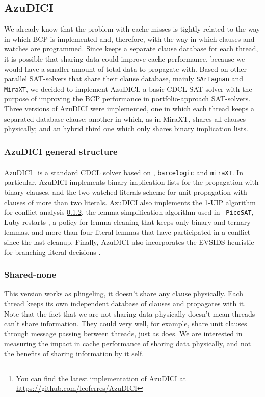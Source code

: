 \subsection{AzuDICI}
\label{sec:azudici}

We already know that the problem with cache-misses is tightly related
to the way in which BCP is implemented \cite{paper cache misses sat} and,
therefore, with the way in which clauses and watches are programmed.
Since \pling keeps a separate clause database for each thread, it is 
possible that sharing data could improve cache performance, because
we would have a smaller amount of total data to propagate with.
Based on other parallel SAT-solvers that share their clause database, 
mainly {\tt SArTagnan} and {\tt MiraXT}, we decided to implement AzuDICI, 
a basic CDCL SAT-solver with the purpose of improving the BCP performance
in portfolio-approach SAT-solvers.
Three versions of AzuDICI were implemented, one in which each thread keeps
a separated database clause; another in which, as in MiraXT, shares all
clauses physically; and an hybrid third one which only shares binary
implication lists.

\subsubsection{AzuDICI general structure}

AzuDICI\footnote{You can find the latest implementation of AzuDICI at
  \url{https://github.com/leoferres/AzuDICI}} is a standard CDCL
solver based on \pling, {\tt barcelogic} and {\tt miraXT}.
In particular, AzuDICI implements binary implication lists for the
propagation with binary clauses, and the two-watched literals scheme
for unit propagation \cite{} with clauses of more than two
literals. AzuDICI also implements the 1-UIP algorithm for conflict
analysis \ref{}, the lemma simplification algorithm used in {\tt
  PicoSAT}, Luby restarts \cite{}, a policy for lemma cleaning that
keeps only binary and ternary lemmas, and more than four-literal
lemmas that have participated in a conflict since the last
cleanup. Finally, AzuDICI also incorporates the EVSIDS heuristic for
branching literal decisions \cite{}.

\subsubsection{Shared-none}

This version works as plingeling, it doesn't share any clause physically. 
Each thread keeps its own independent database of clauses and propagates 
with it. Note that the fact that we are not sharing data physically 
doesn't mean threads can't share information. They could very well, for 
example, share unit clauses through message passing between threads, just 
as \pling does. We are interested in measuring the impact in cache 
performance of sharing data physically, and not the benefits of sharing 
information by it self.

